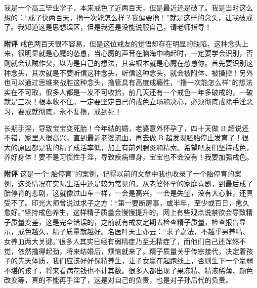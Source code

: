 \begin{case}
    我是一个高三毕业学子，本来戒色了近两百天，但是最近还是破了。我是当时这么想的：“戒了快两百天，撸一次能怎么样？我偏要撸！”就是这样的念头，让我破戒了。我知道这是思想误区，但是我还是没能说服自己，请老师指导！

    \textbf{附评} 戒色两百天很不容易，但是这位戒友的觉悟却存在明显的缺陷，这种念头上来，很明显就是心魔的怂恿，当心魔的声音在脑海中响起时，一定要学会识别，否则就会认贼作父，以为是自己的想法，其实根本就是心魔在怂恿你。首先要识别这种念头，其次就是不要听信这种念头，听信这种念头，就会被附体、被操控！另外也可以通过思维来战胜这种念头，撸管具有高度成瘾性，“撸一次能怎么样”的想法实在不可取，很多人都是一发不可收拾，前几天还有一个戒色一年多破戒的，一破就是三次！根本收不住。一定要坚定自己的戒色立场和决心，必须彻底戒除手淫恶习，要戒就彻底，永不复撸，戒到死！
\end{case}

\begin{case}
    长期手淫，导致宝宝变死胎！今年结的婚，老婆意外怀孕了，四十天做 B 超说还不错，家里人很高兴，直到最近老婆流血，再去做 B 超发现胚胎停止发育了！很大的原因都是我的精子成活率低，加上有前列腺炎和精索。希望吧友们坚持戒色，养好身体！要不是习惯性手淫，导致疾病缠身，宝宝也不会没有！我要加强戒色。

    \textbf{附评} 这是一个“胎停育”的案例，记得以前的文章中我也收录了一个胎停育的案例，这类情况在实际生活中还是较为常见的。从老婆怀孕的家庭喜剧，到最后成了胎停育的悲剧，这就像过山车一样，一会是高兴，一会是失望，没有大心脏，还真受不了。印光大师曾说过求子之方：“第一要断房事，或半年，至少或百日，愈久愈好。”坚持戒色养生，这样精子质量会慢慢提升的，网上有些观点说禁欲会导致精子质量变差，这是完全错误的，之前就有戒友定期去检查精子质量，检查报告显示，戒色越久，精子质量就越好。名医叶天士亦云：“求子之法，不越乎男养精、女养血两大关键。”很多人其实已经有弱精症乃至无精症了，而他们自己还浑然不觉，依然撸得起劲，将来结婚后，烦恼就来了。精子质量关乎传宗接代，决定着孩子的先天体质，我们应该好好保精养生，让子女赢在起跑线上，否则生下一个羸弱不堪的孩子，将来看病花钱也不计其数。很多人都出现了果冻精、精液稀薄、颜色改变等，真的不能再手淫了，这是对自己的负责，也是对子孙后代的负责。
\end{case}

